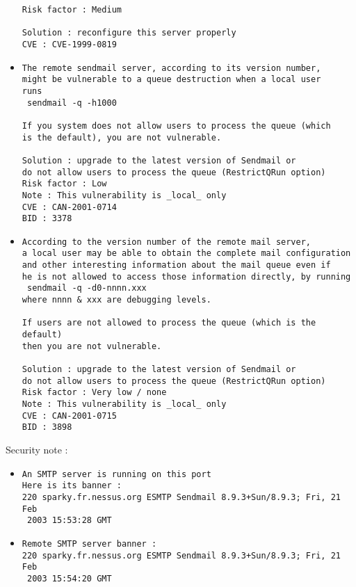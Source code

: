 \documentclass{article}
\begin{document}
\begin{itemize}
\begin{verbatim}
Risk factor : Medium

Solution : reconfigure this server properly
CVE : CVE-1999-0819
\end{verbatim}\item \begin{verbatim}
The remote sendmail server, according to its version number,
might be vulnerable to a queue destruction when a local user
runs
 sendmail -q -h1000

If you system does not allow users to process the queue (which
is the default), you are not vulnerable.

Solution : upgrade to the latest version of Sendmail or 
do not allow users to process the queue (RestrictQRun option)
Risk factor : Low
Note : This vulnerability is _local_ only
CVE : CAN-2001-0714
BID : 3378
\end{verbatim}\item \begin{verbatim}
According to the version number of the remote mail server, 
a local user may be able to obtain the complete mail configuration
and other interesting information about the mail queue even if
he is not allowed to access those information directly, by running
 sendmail -q -d0-nnnn.xxx
where nnnn & xxx are debugging levels.

If users are not allowed to process the queue (which is the default)
then you are not vulnerable.

Solution : upgrade to the latest version of Sendmail or 
do not allow users to process the queue (RestrictQRun option)
Risk factor : Very low / none
Note : This vulnerability is _local_ only
CVE : CAN-2001-0715
BID : 3898
\end{verbatim}\end{itemize}
Security note :\\
\begin{itemize}
\item \begin{verbatim}
An SMTP server is running on this port
Here is its banner : 
220 sparky.fr.nessus.org ESMTP Sendmail 8.9.3+Sun/8.9.3; Fri, 21 Feb
 2003 15:53:28 GMT
\end{verbatim}\item \begin{verbatim}
Remote SMTP server banner :
220 sparky.fr.nessus.org ESMTP Sendmail 8.9.3+Sun/8.9.3; Fri, 21 Feb
 2003 15:54:20 GMT

\end{verbatim}\end{itemize}
\end{document}

